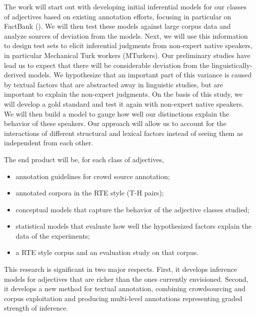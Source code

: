 \documentclass[10pt]{article}
\newcommand{\moveup}{\vspace*{-1.8mm}}
\begin{document}
The work will start out with developing initial inferential models for our classes of adjectives based on existing annotation efforts, focusing in particular on FactBank (\cite{factbank:2009}).
We will then test these models against large corpus data and analyze sources of deviation from the models. Next, we will use this information to design test sets to elicit inferential judgments from non-expert native speakers, in particular Mechanical Turk workers (MTurkers). Our preliminary studies have lead us to expect that there will be considerable deviation from the linguistically-derived models. We hypothesize that an important part of this variance is caused by textual factors that are abstracted away in linguistic studies, but are important to explain the non-expert judgments. On the basis of this study, we will develop a gold standard and test it again with non-expert native speakers. We will then build a model to gauge how well our distinctions explain the behavior of these speakers. Our approach will allow us to account for the interactions of different structural and lexical factors instead of seeing them as independent from each other. 

The end product will be, for each class of adjectives,
\begin{itemize}
\moveup
\item annotation guidelines for crowd source annotation;
\moveup
\item annotated corpora in the RTE style (T-H pairs);
\moveup
\item conceptual models that capture the behavior of the adjective classes studied;
\moveup
\item statistical models that evaluate how well the hypothesized factors explain the data of the experiments;
\moveup
\moveup
\moveup
\item a RTE style corpus and an evaluation study on that corpus.
\moveup
\end{itemize} 

This research is significant in two major respects. First, it develops inference models for adjectives that are richer than the ones currently envisioned. Second, it develops a new method for textual annotation, combining crowdsourcing and corpus exploitation and producing multi-level annotations representing graded strength of inference.
\end{document}
